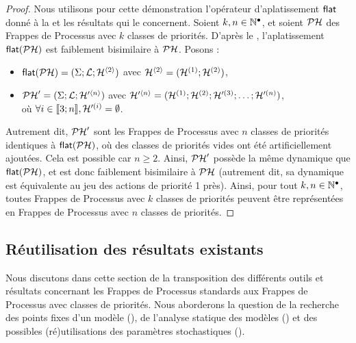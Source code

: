 \begin{proof}
  Nous utilisons pour cette démonstration
  l'opérateur d'aplatissement $\mathsf{flat}$ donné à la 
  et les résultats qui le concernent.
  Soient $k, n \in \mathbb{N}^\bullet$,
  et soient $\mathcal{PH}$ des Frappes de Processus avec $k$ classes de priorités.
  D'après le ,
  l'aplatissement $\mathsf{flat}(\mathcal{PH})$ est faiblement bisimilaire à $\mathcal{PH}$.
  Posons :
  \begin{itemize}
    \item $\mathsf{flat}(\mathcal{PH}) = (\Sigma; \mathcal{L}; \mathcal{H}^{{\langle 2 \rangle}})$
      avec $\mathcal{H}^{{\langle 2 \rangle}} = (\mathcal{H}^{(1)}; \mathcal{H}^{(2)})$,
    \item $\mathcal{PH}' = (\Sigma; \mathcal{L}; \mathcal{H}'^{{\langle n \rangle}})$
      avec $\mathcal{H}'^{{\langle n \rangle}} = (\mathcal{H}^{(1)}; \mathcal{H}^{(2)}; \mathcal{H}'^{(3)}; \ldots; \mathcal{H}'^{(n)})$, \\
      \hspace*{1em} où $\forall i \in \mathopen{\llbracket}3\mathclose{};n\mathclose{\rrbracket}, \mathcal{H}'^{(i)} = \emptyset$.
  \end{itemize}
  Autrement dit, $\mathcal{PH}'$ sont les Frappes de Processus avec $n$ classes de priorités
  identiques à $\mathsf{flat}(\mathcal{PH})$, où des classes de priorités vides ont été
  artificiellement ajoutées.
  Cela est possible car $n \geq 2$.
  Ainsi, $\mathcal{PH}'$ possède la même dynamique que $\mathsf{flat}(\mathcal{PH})$,
  et est donc faiblement bisimilaire à $\mathcal{PH}$
  (autrement dit, sa dynamique est équivalente au jeu des actions de priorité 1 près).
  Ainsi, pour tout $k, n \in \mathbb{N}^\bullet$,
  toutes Frappes de Processus avec $k$ classes de priorités peuvent être représentées
  en Frappes de Processus avec $n$ classes de priorités.
\end{proof}



\subsection{Réutilisation des résultats existants}



Nous discutons dans cette section de la transposition des différents outils et
résultats concernant les Frappes de Processus standards
aux Frappes de Processus avec classes de priorités.
Nous aborderons la question de la recherche des points fixes d'un modèle (),
de l'analyse statique des modèles ()
et des possibles (ré)utilisations des paramètres stochastiques ().

